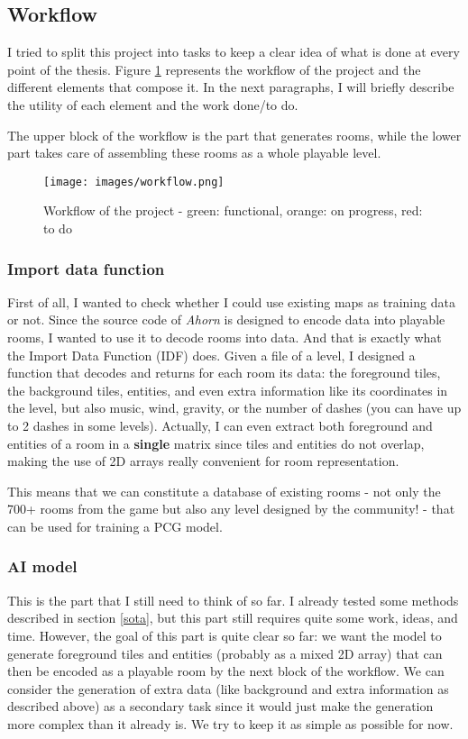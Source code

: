 \documentclass{article}
\begin{document}
\subsection{Workflow}
I tried to split this project into tasks to keep a clear idea of what is done at every point of the thesis. Figure \ref{fig:workflow} represents the workflow of the project and the different elements that compose it. In the next paragraphs, I will briefly describe the utility of each element and the work done/to do.

\noindent The upper block of the workflow is the part that generates rooms, while the lower part takes care of assembling these rooms as a whole playable level. 

\begin{figure}[h]
\centering
    \texttt{[image: images/workflow.png]}
    \caption{Workflow of the project - green: functional, orange: on progress, red: to do}
    \label{fig:workflow}
\end{figure}


\subsubsection{Import data function}
First of all, I wanted to check whether I could use existing maps as training data or not. Since the source code of \textit{Ahorn} is designed to encode data into playable rooms, I wanted to use it to decode rooms into data. And that is exactly what the Import Data Function (IDF) does. Given a file of a level, I designed a function that decodes and returns for each room its data: the foreground tiles, the background tiles, entities, and even extra information like its coordinates in the level, but also music, wind, gravity, or the number of dashes (you can have up to 2 dashes in some levels). Actually, I can even extract both foreground and entities of a room in a \textbf{single} matrix since tiles and entities do not overlap, making the use of 2D arrays really convenient for room representation.

\noindent This means that we can constitute a database of existing rooms - not only the 700+ rooms from the game but also any level designed by the community! - that can be used for training a PCG model.

\subsubsection{AI model}
This is the part that I still need to think of so far. I already tested some methods described in section \ref{sota}, but this part still requires quite some work, ideas, and time. However, the goal of this part is quite clear so far: we want the model to generate foreground tiles and entities (probably as a mixed 2D array) that can then be encoded as a playable room by the next block of the workflow. We can consider the generation of extra data (like background and extra information as described above) as a secondary task since it would just make the generation more complex than it already is. We try to keep it as simple as possible for now.
\end{document}
